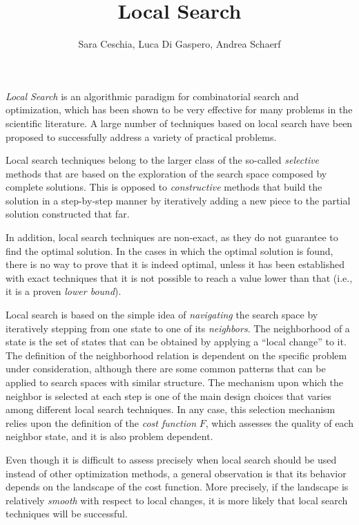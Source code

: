 \title{Local Search}
\label{chp:local-search}
\author{Sara Ceschia, Luca Di Gaspero, Andrea Schaerf}
\maketitle


\emph{Local Search} is an algorithmic paradigm for combinatorial
search and optimization, which has been shown to be very effective for many
problems in the scientific literature. A large number
of techniques based on local search have been proposed to successfully
address a variety of practical problems.


Local search techniques belong to the larger class of the so-called
\emph{selective} methods that are based on the exploration of the
search space composed by complete solutions. This is opposed to
\emph{constructive} methods that build the solution in a step-by-step
manner by iteratively adding a new piece to the partial solution constructed
that far.  

In addition, local search techniques are non-exact, as they
do not guarantee to find the optimal solution. In the cases in which
the optimal solution is found, there is no way to prove that it is
indeed optimal, unless it has been established
with exact techniques that it is not possible to reach a value lower than that (i.e., it is a proven \emph{lower bound}).

Local search is based on the simple idea of \emph{navigating} the
search space by iteratively stepping from one state to one of its
\emph{neighbors}. The neighborhood of a state is the set of states
that can be obtained by applying a ``local change'' to it. The
definition of the neighborhood relation is dependent on the specific
problem under consideration, although there are some common
patterns that can be applied to search spaces with
similar structure.  The mechanism upon which the neighbor is selected
at each step is one of the main design choices that varies
among different local search techniques. In any case, this selection
mechanism relies upon the definition of the \emph{cost function} $F$,
which assesses the quality of each neighbor state, and it is also
problem dependent.

Even though it is difficult to assess precisely when local search should be 
used instead of other optimization methods, a general observation is that 
its behavior depends on the landscape of the cost function. More precisely, if the 
landscape is relatively \emph{smooth} with respect to local 
changes, it is more likely that local search techniques will be successful.


